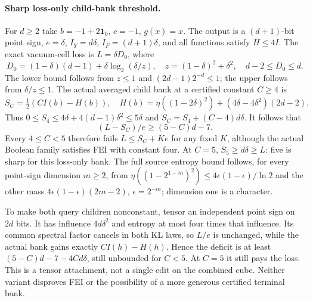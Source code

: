 \documentclass[11pt]{article}
\begin{document}
\paragraph{Sharp loss-only child-bank threshold.}
For $d\ge2$ take $b=-1+2\mathbf1_0$, $c=-1$, $g(x)=x$.
The output is a $(d+1)$-bit point sign, $e=\delta$, $I_Y=d\delta$,
$I_F=(d+1)\delta$, and all functions satisfy $H\le4I$.
The exact vacuum-cell loss is $L=\delta D_0$, where
\[
 D_0=(1-\delta)(d-1)+\delta\log_2(\delta/z),\quad
 z=(1-\delta)^2+\delta^2,\quad d-2\le D_0\le d.
\]
The lower bound follows from $z\le1$ and $(2d-1)2^{-d}\le1$;
the upper follows from $\delta/z\le1$. The actual averaged child bank
at a certified constant $C\ge4$ is
\[
 S_C=\tfrac12(CI(b)-H(b)),\quad
 H(b)=\eta((1-2\delta)^2)+(4\delta-4\delta^2)(2d-2).
\]
Thus $0\le S_4\le4\delta+4(d-1)\delta^2\le5\delta$ and
$S_C=S_4+(C-4)d\delta$. It follows that
\[
 (L-S_C)/e\ge(5-C)d-7.
\]
Every $4\le C<5$ therefore fails $L\le S_C+Ke$ for any fixed $K$,
although the actual Boolean family satisfies FEI with constant four.
At $C=5$, $S_5\ge d\delta\ge L$: five is sharp for this loss-only
bank. The full source entropy bound follows, for every point-sign
dimension $m\ge2$, from
$\eta((1-2^{1-m})^2)\le4\epsilon(1-\epsilon)/\ln2$
and the other mass $4\epsilon(1-\epsilon)(2m-2)$,
$\epsilon=2^{-m}$; dimension one is a character.

To make both query children nonconstant, tensor an independent point
sign on $2d$ bits. It has influence $4d\delta^2$ and entropy at most
four times that influence. Its common spectral factor cancels in both
KL laws, so $L/e$ is unchanged, while the actual bank gains exactly
$CI(h)-H(h)$. Hence the deficit is at least
$(5-C)d-7-4Cd\delta$, still unbounded for $C<5$. At $C=5$ it
still pays the loss. This is a tensor attachment, not a single edit on
the combined cube. Neither variant disproves FEI or the possibility of
a more generous certified terminal bank.
\end{document}
